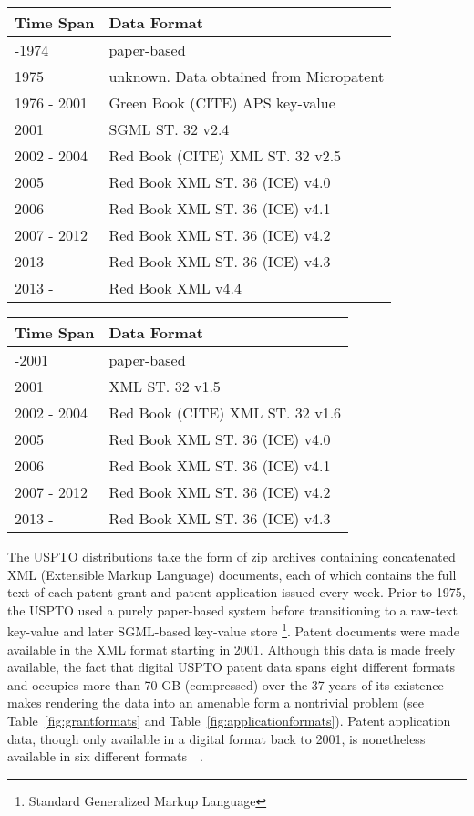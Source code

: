 \begin{table*}[t]
\center %
\begin{tabular}{|l|l|}
\hline 
Time Span  & Data Format \tabularnewline
\hline 
-1974  & paper-based \tabularnewline
1975  & unknown. Data obtained from Micropatent \tabularnewline
1976 - 2001  & Green Book (CITE) APS key-value \tabularnewline
2001  & SGML ST. 32 v2.4 \tabularnewline
2002 - 2004  & Red Book (CITE) XML ST. 32 v2.5 \tabularnewline
2005  & Red Book XML ST. 36 (ICE) v4.0 \tabularnewline
2006  & Red Book XML ST. 36 (ICE) v4.1 \tabularnewline
2007 - 2012  & Red Book XML ST. 36 (ICE) v4.2 \tabularnewline
2013  & Red Book XML ST. 36 (ICE) v4.3 \tabularnewline
2013 -  & Red Book XML v4.4 \tabularnewline
\hline 
\end{tabular}\caption{Table of USPTO grant data formats}


\label{fig:grantformats} 
\end{table*}
\begin{table*}[t]
\center %
\begin{tabular}{|l|l|}
\hline 
Time Span  & Data Format \tabularnewline
\hline 
-2001 & paper-based \tabularnewline
2001  & XML ST. 32 v1.5\tabularnewline
2002 - 2004  & Red Book (CITE) XML ST. 32 v1.6 \tabularnewline
2005 & Red Book XML ST. 36 (ICE) v4.0\tabularnewline
2006 & Red Book XML ST. 36 (ICE) v4.1 \tabularnewline
2007 - 2012 & Red Book XML ST. 36 (ICE) v4.2 \tabularnewline
2013 -  & Red Book XML ST. 36 (ICE) v4.3\tabularnewline
\hline 
\end{tabular}\caption{Table of USPTO grant data formats}


\label{fig:applicationformats} 
\end{table*}


The USPTO distributions take the form of zip archives containing concatenated
XML (Extensible Markup Language) documents, each of which contains
the full text of each patent grant and patent application issued every
week. Prior to 1975, the USPTO used a purely paper-based system before
transitioning to a raw-text key-value and later SGML-based key-value
store %
\footnote{Standard Generalized Markup Language%
}. Patent documents were made available in the XML format starting
in 2001. Although this data is made freely available, the fact that
digital USPTO patent data spans eight different formats and occupies
more than 70 GB (compressed) over the 37 years of its existence makes
rendering the data into an amenable form a nontrivial problem (see
Table~\ref{fig:grantformats} and Table~\ref{fig:applicationformats}).
Patent application data, though only available in a digital format
back to 2001, is nonetheless available in six different formats~\cite{xmlresources}~\cite{xmlretrospective}.
